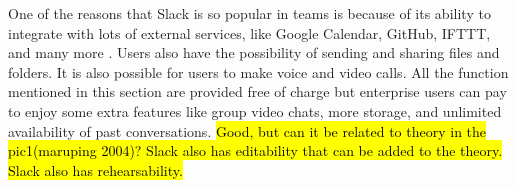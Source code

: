 One of the reasons that Slack is so popular in teams is because of its ability to integrate with lots of external services, like Google Calendar, GitHub, IFTTT, and many more \citep{Williams2015}. Users also have the possibility of sending and sharing files and folders. It is also possible for users to make voice and video calls. All the function mentioned in this section are provided free of charge but enterprise users can pay to enjoy some extra features like group video chats, more storage, and unlimited availability of past conversations.
\hl{Good, but can it be related to theory in the pic1(maruping 2004)? Slack also has editability that can be added to the theory. Slack also has rehearsability. }

